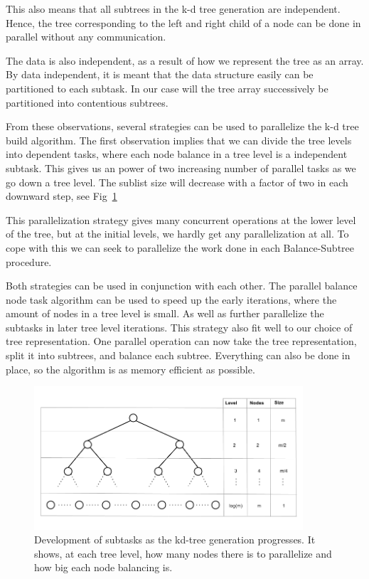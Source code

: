 This also means that all subtrees in the k-d tree generation are independent. Hence, the tree corresponding to the left and right child of a node can be done in parallel without any communication. 

The data is also independent, as a result of how we represent the tree as an array. By data independent, it is meant that the data structure easily can be partitioned to each subtask. In our case will the tree array successively be partitioned into contentious subtrees.

From these observations, several strategies can be used to parallelize the k-d tree build algorithm. The first observation implies that we can divide the tree levels into dependent tasks, where each node balance in a tree level is a independent subtask. This gives us an power of two increasing number of parallel tasks as we go down a tree level. The sublist size will decrease with a factor of two in each downward step, see Fig~\ref{fig:tree_level_development}

This parallelization strategy gives many concurrent operations at the lower level of the tree, but at the initial levels, we hardly get any parallelization at all. To cope with this we can seek to parallelize the work done in each Balance-Subtree procedure.

Both strategies can be used in conjunction with each other. The parallel balance node task algorithm can be used to speed up the early iterations, where the amount of nodes in a tree level is small. As well as further parallelize the subtasks in later tree level iterations. This strategy also fit well to our choice of tree representation. One parallel operation can now take the tree representation, split it into subtrees, and balance each subtree. Everything can also be done in place, so the algorithm is as memory efficient as possible.

\begin{figure}[ht!]
\centering
\includegraphics[width=100mm]{../gfx/Tree_level_development.png}

\caption{Development of subtasks as the kd-tree generation progresses. It shows, at each tree level, how many nodes there is to parallelize and how big each node balancing is. }
\label{fig:tree_level_development}
\end{figure}

